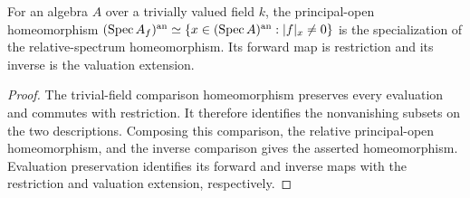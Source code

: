 \begin{corollary}
\label{spectrum:localization-trivial-field}
\leanok
{}
For an algebra $A$ over a trivially valued field $k$, the principal-open
homeomorphism $(\operatorname{Spec} A_f)^{\mathrm{an}}\simeq\{x\in(\operatorname{Spec} A)^{\mathrm{an}}:|f|_x\ne0\}$
is the specialization of the relative-spectrum homeomorphism.
Its forward map is restriction and its inverse is the valuation extension.
\end{corollary}
\begin{proof}
The trivial-field comparison homeomorphism preserves every evaluation and
commutes with restriction. It therefore identifies the nonvanishing subsets
on the two descriptions. Composing this comparison, the relative principal-open
homeomorphism, and the inverse comparison gives the asserted homeomorphism.
Evaluation preservation identifies its forward and inverse maps with the
restriction and valuation extension, respectively.
\end{proof}
